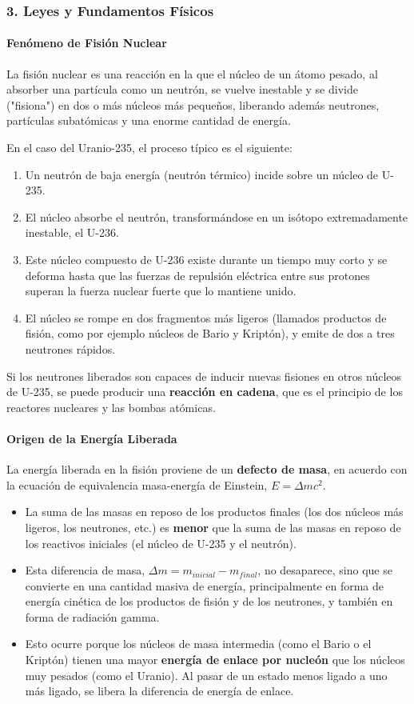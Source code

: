 \subsubsection*{3. Leyes y Fundamentos Físicos}
\paragraph{Fenómeno de Fisión Nuclear}
La fisión nuclear es una reacción en la que el núcleo de un átomo pesado, al absorber una partícula como un neutrón, se vuelve inestable y se divide ("fisiona") en dos o más núcleos más pequeños, liberando además neutrones, partículas subatómicas y una enorme cantidad de energía.

En el caso del Uranio-235, el proceso típico es el siguiente:
\begin{enumerate}
    \item Un neutrón de baja energía (neutrón térmico) incide sobre un núcleo de U-235.
    \item El núcleo absorbe el neutrón, transformándose en un isótopo extremadamente inestable, el U-236.
    \item Este núcleo compuesto de U-236 existe durante un tiempo muy corto y se deforma hasta que las fuerzas de repulsión eléctrica entre sus protones superan la fuerza nuclear fuerte que lo mantiene unido.
    \item El núcleo se rompe en dos fragmentos más ligeros (llamados productos de fisión, como por ejemplo núcleos de Bario y Kriptón), y emite de dos a tres neutrones rápidos.
\end{enumerate}
Si los neutrones liberados son capaces de inducir nuevas fisiones en otros núcleos de U-235, se puede producir una \textbf{reacción en cadena}, que es el principio de los reactores nucleares y las bombas atómicas.

\paragraph{Origen de la Energía Liberada}
La energía liberada en la fisión proviene de un \textbf{defecto de masa}, en acuerdo con la ecuación de equivalencia masa-energía de Einstein, $E=\Delta m c^2$.
\begin{itemize}
    \item La suma de las masas en reposo de los productos finales (los dos núcleos más ligeros, los neutrones, etc.) es \textbf{menor} que la suma de las masas en reposo de los reactivos iniciales (el núcleo de U-235 y el neutrón).
    \item Esta diferencia de masa, $\Delta m = m_{inicial} - m_{final}$, no desaparece, sino que se convierte en una cantidad masiva de energía, principalmente en forma de energía cinética de los productos de fisión y de los neutrones, y también en forma de radiación gamma.
    \item Esto ocurre porque los núcleos de masa intermedia (como el Bario o el Kriptón) tienen una mayor \textbf{energía de enlace por nucleón} que los núcleos muy pesados (como el Uranio). Al pasar de un estado menos ligado a uno más ligado, se libera la diferencia de energía de enlace.
\end{itemize}

